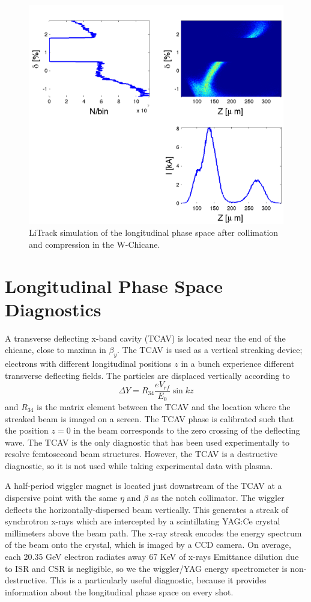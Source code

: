 \begin{figure}[hbt]
  \includegraphics[width=\columnwidth]{figures/sect20.pdf}
  \caption{LiTrack simulation of the longitudinal phase space after collimation and compression in the W-Chicane.}
  \label{sect20}
\end{figure}

\section{Longitudinal Phase Space Diagnostics}
A transverse deflecting x-band cavity (TCAV) is located near the end of the chicane, close to maxima in $\beta_y$. The TCAV is used as a vertical streaking device; electrons with different longitudinal positions $z$ in a bunch experience different transverse deflecting fields. The particles are displaced vertically according to
\begin{equation}
\Delta Y = R_{34}\frac{e V_{rf}}{E_0}\sin{kz}
\end{equation}
and $R_{34}$ is the matrix element between the TCAV and the location where the streaked beam is imaged on a screen. The TCAV phase is calibrated such that the position $z=0$ in the beam corresponds to the zero crossing of the deflecting wave. The TCAV is the only diagnostic that has been used experimentally to resolve femtosecond beam structures. However, the TCAV is a destructive diagnostic, so it is not used while taking experimental data with plasma.

A half-period wiggler magnet is located just downstream of the TCAV at a dispersive point with the same $\eta$ and $\beta$ as the notch collimator. The wiggler deflects the horizontally-dispersed beam vertically. This generates a streak of synchrotron x-rays which are intercepted by a scintillating YAG:Ce crystal millimeters above the beam path. The x-ray streak encodes the energy spectrum of the beam onto the crystal, which is imaged by a CCD camera. On average, each 20.35 GeV electron radiates away 67 KeV of x-rays Emittance dilution due to ISR and CSR is negligible, so we the wiggler/YAG energy spectrometer is non-destructive. This is a particularly useful diagnostic, because it provides information about the longitudinal phase space on every shot.

